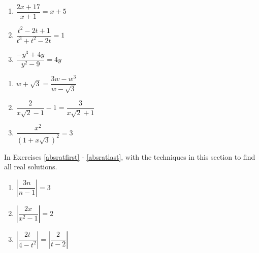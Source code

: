 \begin{multicols}{3}
\begin{enumerate}
\setcounter{enumi}{\value{HW}}


\item $\dfrac{2x + 17}{x + 1} = x + 5$
\item $\dfrac{t^{2} - 2t + 1}{t^{3} + t^{2} - 2t} = 1$
\item $\dfrac{-y^{3} + 4y}{y^{2} - 9} = 4y$  

\setcounter{HW}{\value{enumi}}
\end{enumerate}
\end{multicols}

\begin{multicols}{3}
\begin{enumerate}
\setcounter{enumi}{\value{HW}}


\item $w + \sqrt{3} = \dfrac{3w - w^3}{w - \sqrt{3}}$
\item $\dfrac{2}{x\sqrt{2} - 1}  - 1 = \dfrac{3}{x \sqrt{2} + 1}$
\item $\dfrac{x^2}{(1 + x\sqrt{3})^2} = 3$ \label{rateqnlast}

\setcounter{HW}{\value{enumi}}
\end{enumerate}
\end{multicols}



In Exercises \ref{absratfirst} - \ref{absratlast},  with the techniques in this section to find all real solutions.

\begin{multicols}{3}
\begin{enumerate}
\setcounter{enumi}{\value{HW}}

\item $\left|\dfrac{3n}{n-1}  \right| = 3$ \label{absratfirst}
\item $\left| \dfrac{2x}{x^2-1}\right| = 2$
\item $\left| \dfrac{2t}{4-t^2}\right| = \left|\dfrac{2}{t-2}\right|$ \label{absratlast}

\setcounter{HW}{\value{enumi}}
\end{enumerate}
\end{multicols}


